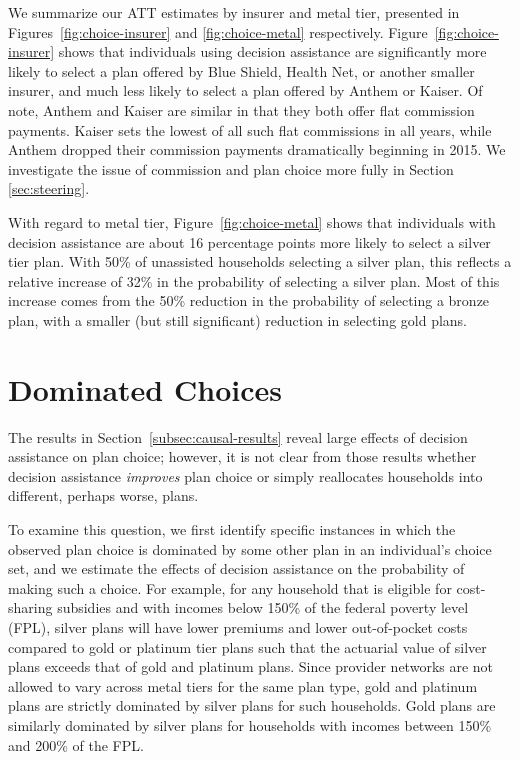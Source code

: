 \documentclass[12pt]{article}
\begin{document}
We summarize our ATT estimates by insurer and metal tier, presented in Figures~\ref{fig:choice-insurer} and \ref{fig:choice-metal} respectively. Figure~\ref{fig:choice-insurer} shows that individuals using decision assistance are significantly more likely to select a plan offered by Blue Shield, Health Net, or another smaller insurer, and much less likely to select a plan offered by Anthem or Kaiser. Of note, Anthem and Kaiser are similar in that they both offer flat commission payments. Kaiser sets the lowest of all such flat commissions in all years, while Anthem dropped their commission payments dramatically beginning in 2015. We investigate the issue of commission and plan choice more fully in Section \ref{sec:steering}.

With regard to metal tier, Figure~\ref{fig:choice-metal} shows that individuals with decision assistance are about 16 percentage points more likely to select a silver tier plan. With 50\% of unassisted households selecting a silver plan, this reflects a relative increase of 32\% in the probability of selecting a silver plan. Most of this increase comes from the 50\% reduction in the probability of selecting a bronze plan, with a smaller (but still significant) reduction in selecting gold plans.


\section{Dominated Choices}
\label{sec:dominated}
The results in Section~\ref{subsec:causal-results} reveal large effects of decision assistance on plan choice; however, it is not clear from those results whether decision assistance \textit{improves} plan choice or simply reallocates households into different, perhaps worse, plans. 

To examine this question, we first identify specific instances in which the observed plan choice is dominated by some other plan in an individual's choice set, and we estimate the effects of decision assistance on the probability of making such a choice. For example, for any household that is eligible for cost-sharing subsidies and with incomes below 150\% of the federal poverty level (FPL), silver plans will have lower premiums and lower out-of-pocket costs compared to gold or platinum tier plans such that the actuarial value of silver plans exceeds that of gold and platinum plans. Since provider networks are not allowed to vary across metal tiers for the same plan type, gold and platinum plans are strictly dominated by silver plans for such households. Gold plans are similarly dominated by silver plans for households with incomes between 150\% and 200\% of the FPL. 
\end{document}
